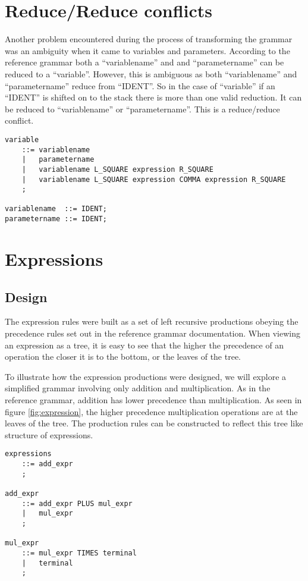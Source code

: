 \documentclass[oneside]{amsart}
\theoremstyle{definition}
\theoremstyle{remark}
\numberwithin{equation}{section}
\begin{document}
\newpage

\section{Reduce/Reduce conflicts}
Another problem encountered during the process of transforming the grammar was an ambiguity when it
came to variables and parameters. According to the reference grammar both a ``variablename'' and
and ``parametername'' can be reduced to a ``variable''. However, this is ambiguous as both
``variablename'' and ``parametername'' reduce from ``IDENT''. So in the case of ``variable'' if
an ``IDENT'' is shifted on to the stack there is more than one valid reduction. It can be reduced to
``variablename'' or ``parametername''. This is a reduce/reduce conflict.

\begin{lstlisting}
variable
    ::= variablename
    |   parametername
    |   variablename L_SQUARE expression R_SQUARE
    |   variablename L_SQUARE expression COMMA expression R_SQUARE
    ;

variablename  ::= IDENT;
parametername ::= IDENT;
\end{lstlisting}


\lstset{numbers=left}
\section{Expressions}
\subsection{Design}
The expression rules were built as a set of left recursive productions obeying the precedence rules
set out in the reference grammar documentation. When viewing an expression as a tree, it is easy to
see that the higher the precedence of an operation the closer it is to the bottom, or the leaves of
the tree.



To illustrate how the expression productions were designed, we will explore a simplified grammar
involving only addition and multiplication. As in the reference grammar, addition has lower
precedence than multiplication. As seen in figure \ref{fig:expression}, the higher precedence
multiplication operations are at the leaves of the tree. The production rules can be constructed
to reflect this tree like structure of expressions.

\begin{lstlisting}
expressions
    ::= add_expr
    ;

add_expr
    ::= add_expr PLUS mul_expr
    |   mul_expr
    ;

mul_expr
    ::= mul_expr TIMES terminal
    |   terminal
    ;
\end{lstlisting}
\end{document}
